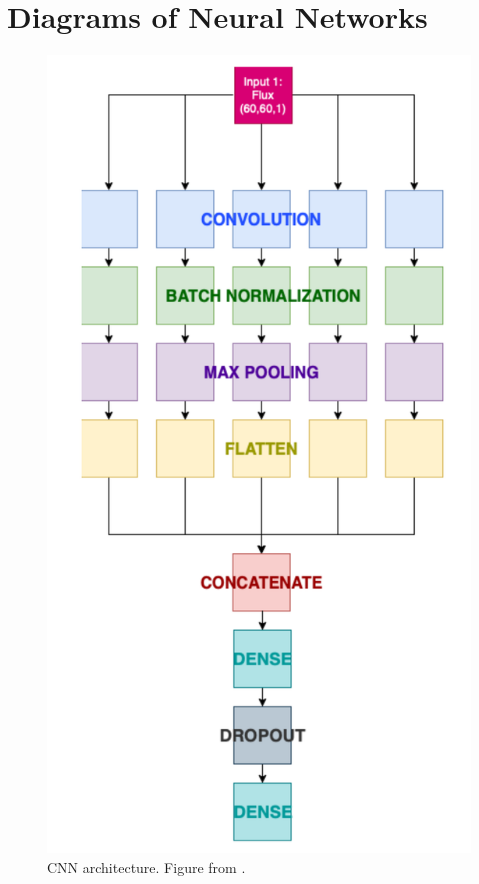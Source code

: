 \chapter{Diagrams of Neural Networks}
\label{app:NN_Architecture}
\begin{figure}[h!]
    \centering
    \includegraphics[height=.4\pdfpageheight]{figures/EddieCNN.png}
    \caption{CNN architecture. Figure from \textcite{Sepeku2022}.}
    \label{fig:cnn_architecture}
\end{figure}

